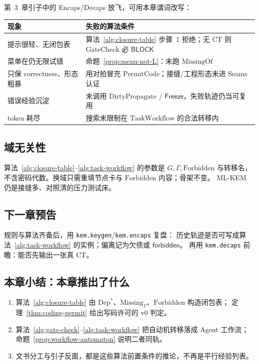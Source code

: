 \documentclass[UTF8,a4paper,11pt]{ctexart}
\theoremstyle{definition}
\theoremstyle{plain}
\theoremstyle{remark}
\numberwithin{figure}{section}
\numberwithin{table}{section}
\begin{document}
第~3~章引子中的 Encaps/Decaps 放飞，可用本章谓词改写：

\begin{center}
\begin{tabular}{@{}L{5.2cm}L{8.6cm}@{}}
  \toprule
  现象 & 失败的算法条件 \\
  \midrule
  提示很轻、无闭包表 &
  算法~\ref{alg:closure-table} 步骤~1 拒绝；无 $\mathrm{CT}$ 则 $\mathrm{GateCheck}$ 必 $\mathsf{BLOCK}$ \\
  菜单在仍无限试错 &
  命题~\ref{prop:menu-not-L}：未跑 $\mathrm{MissingOf}$ \\
  只保 correctness、形态粗暴 &
  用对拍冒充 $\mathrm{PermitCode}$；接缝/工程形态未进 $\mathrm{Seams}$ 认证 \\
  错误经验沉淀 &
  未调用 $\mathrm{DirtyPropagate}$ / $\mathsf{Freeze}$，失败轨迹仍当可复用 \\
  token 耗尽 &
  搜索未限制在 $\mathrm{TaskWorkflow}$ 的合法转移内 \\
  \bottomrule
\end{tabular}
\end{center}

\subsection{域无关性}
\label{sec:gates-domain}

算法~\ref{alg:closure-table}--\ref{alg:task-workflow} 的参数是 $G,\Gamma,\mathrm{Forbidden}$ 与转移名，
不含密码代数。换域只需重填节点卡与 $\mathrm{Forbidden}$ 内容；骨架不变。
ML-KEM 仍是接缝多、对照清的压力测试床。

\subsection{下一章预告}
规则与算法齐备后，用 \texttt{kem.keygen}/\texttt{kem.encaps} 复盘：
历史轨迹是否可写成算法~\ref{alg:task-workflow} 的实例；偏离记为欠债或 $\mathsf{forbidden}$。
再用 \texttt{kem.decaps} 前瞻：能否先输出一张真 $\mathrm{CT}$。

\subsection{本章小结：本章推出了什么}
\label{sec:gates-summary}

\begin{enumerate}
  \item 算法~\ref{alg:closure-table} 由 $\mathrm{Dep}^*$、$\mathrm{Missing}_\Gamma$、$\mathrm{Forbidden}$ 构造闭包表；
        定理~\ref{thm:coding-permit} 给出写码许可的 v0 判定。
  \item 算法~\ref{alg:gate-check}--\ref{alg:task-workflow} 把自动机转移落成 Agent 工作流；
        命题~\ref{prop:workflow-automaton} 说明二者同轨。
  \item 文书分工与引子反面，都是这些算法前置条件的推论，不再是平行经验列表。
\end{enumerate}
\end{document}
